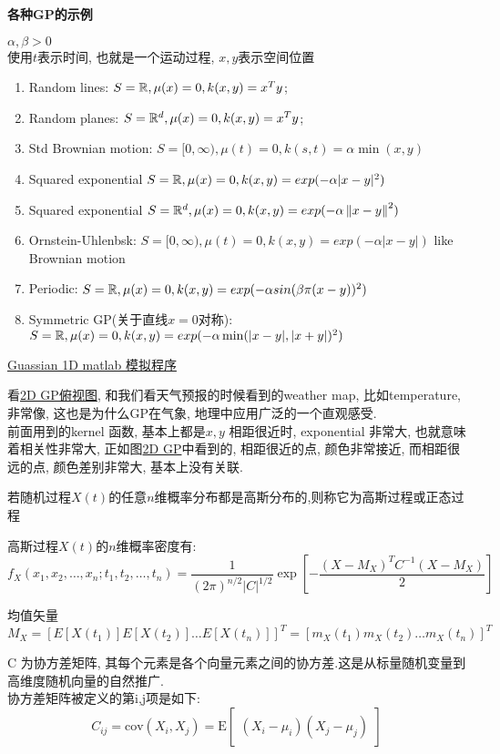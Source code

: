 \begin{example}
\textbf{各种GP的示例}

$\alpha, \beta > 0$\\
使用$t$表示时间, 也就是一个运动过程, $x,y$表示空间位置
\begin{enumerate}
\item  Random lines: $S=\mathbb{R}, \mu(x) = 0, k(x,y) = x^T y$; %
\item  Random planes: $S=\mathbb{R}^d, \mu(x) = 0, k(x,y) = x^T y$; %
\item  Std Brownian motion: $S=[0,\infty), \mu(t) = 0,  k(s,t) = \alpha \min(x,y)$
\item  Squared exponential $S = \mathbb{R}, \mu(x) = 0, k(x,y) = exp(- \alpha |x-y|^2)$ 
\item  Squared exponential $S = \mathbb{R}^d, \mu(x) = 0, k(x,y) = exp(- \alpha \left\Vert x-y\right\Vert^2)$
\item  Ornstein-Uhlenbsk: $S=[0,\infty), \mu(t) = 0, k(x,y)  = exp(- \alpha |x-y|)$ like Brownian motion
\item  Periodic: $S = \mathbb{R}, \mu(x) = 0, k(x,y)  = exp(- \alpha sin(\beta \pi (x-y))^2)$ 
\item  Symmetric GP(关于直线$x=0$对称): $S =\mathbb{R}, \mu(x) = 0, k(x,y)  = exp(-\alpha \min(|x-y|, |x+y|)^2)$
\end{enumerate}
\href{../../demo/math/gaussian_1d.m}{Guassian 1D matlab 模拟程序}
\end{example}

看\href{http://i.imgbox.com/6XtDDnQs.png}{2D GP俯视图}, 和我们看天气预报的时候看到的weather map, 比如temperature, 非常像, 这也是为什么GP在气象, 地理中应用广泛的一个直观感受.\\
前面用到的kernel 函数, 基本上都是$x,y$ 相距很近时, exponential 非常大, 也就意味着相关性非常大, 
正如图\href{http://i.imgbox.com/1OsWR7cU.png}{2D GP}中看到的, 相距很近的点, 颜色非常接近, 而相距很远的点, 颜色差别非常大, 基本上没有关联.

若随机过程$X(t)$的任意$n$维概率分布都是高斯分布的,则称它为高斯过程或正态过程

高斯过程$X(t)$的$n$维概率密度有:
$$
f_X(x_1, x_2, \ldots, x_n; t_1, t_2, \ldots, t_n) = 
\frac{1}{(2\pi)^{n/2} |C|^{1/2}} \exp[- \frac{(X - M_X)^T C^{-1} (X - M_X)}{2}]
$$

均值矢量
$$ M_X = [E[X(t_1)] E[X(t_2)] \ldots E[X(t_n)]]^T = [m_X(t_1) m_X(t_2) \ldots m_X(t_n)]^T $$

C 为协方差矩阵, 其每个元素是各个向量元素之间的协方差.这是从标量随机变量到高维度随机向量的自然推广.\\
协方差矩阵被定义的第i,j项是如下:
$$ C_{ij} = \mathrm{cov}(X_i, X_j) = \mathrm{E}\begin{bmatrix} (X_i - \mu_i)(X_j - \mu_j) \end{bmatrix} $$

